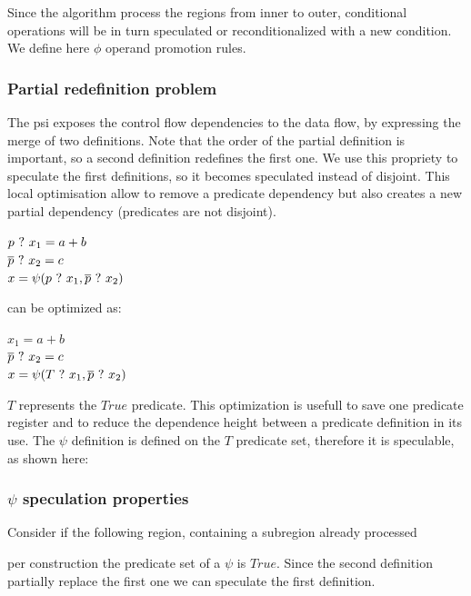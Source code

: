 Since the algorithm process the regions from inner to outer, conditional operations will be in turn speculated or reconditionalized with a new condition. We define here $\phi$ operand promotion rules.

    \subsubsection{Partial redefinition problem}

The psi exposes the control flow dependencies to the data flow, by expressing the merge of two definitions. Note that the order of the partial definition is important, so a second definition redefines the first one. We use this propriety to speculate the first definitions, so it becomes speculated instead of disjoint. This local optimisation allow to remove a predicate dependency but also creates a new partial dependency (predicates are not disjoint).
\footnotesize
\begin{minipage}{6cm}
$ p ~?~ x_1 = a + b $ \\
$ \overline{p} ~?~ x_2 = c $ \\
$ x = \psi(p ~?~ x_1, \overline{p} ~?~ x_2) $ \\
\end{minipage}

can be optimized as:

\begin{minipage}{6cm}
$ x_1 = a + b $ \\
$ \overline{p} ~?~ x_2 = c $ \\
$ x = \psi(T ~?~ x_1, \overline{p} ~?~ x_2) $ \\
\end{minipage}

$T$ represents the $True$ predicate. This optimization is usefull to save one predicate register and to reduce the dependence height between a predicate definition in its use. 
The $\psi$ definition is defined on the $T$ predicate set, therefore it is speculable, as shown here:

     \subsubsection{$\psi$ speculation properties}

Consider if the following region, containing a subregion already processed

per construction the predicate set of a $\psi$ is $True$. Since the second definition partially replace the first one we can speculate the first definition.

